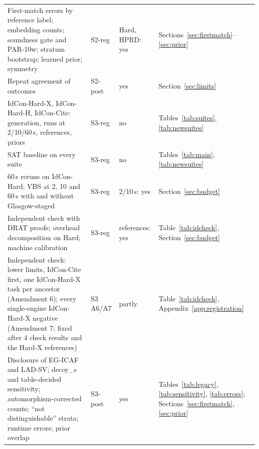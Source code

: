 \begin{table}[t]
\begin{tabular}{p{}llp{}}
First-match errors by reference label; embedding counts; soundness gate and PAR-10w; stratum bootstrap; learned prior; symmetry & S2-reg & Hard, HPRD: yes & Sections~\ref{sec:firstmatch}--\ref{sec:prior}\\
Repeat agreement of outcomes & S2-post & yes & Section~\ref{sec:limits}\\
IdCon-Hard-X, IdCon-Hard-H, IdCon-Cite: generation, runs at 2/10/60\,s, references, priors & S3-reg & no & Tables~\ref{tab:suites}, \ref{tab:newsuites}\\
SAT baseline on every suite & S3-reg & no & Tables~\ref{tab:main}, \ref{tab:newsuites}\\
60\,s reruns on IdCon-Hard; VBS at 2, 10 and 60\,s with and without Glasgow-staged & S3-reg & 2/10\,s: yes & Section~\ref{sec:budget}\\
Independent check with DRAT proofs; overhead decomposition on Hard; machine calibration & S3-reg & references: yes & Table~\ref{tab:idcheck}, Section~\ref{sec:budget}\\
Independent check: lower limits, IdCon-Cite first, one IdCon-Hard-X task per ancestor (Amendment 6); every single-engine IdCon-Hard-X negative (Amendment 7; fixed after 4 check results and the Hard-X references) & S3 A6/A7 & partly & Table~\ref{tab:idcheck}, Appendix~\ref{app:registration}\\
Disclosure of EG-ICAF and LAD-SV; \textsf{decoy\_s} and table-decided sensitivity; automorphism-corrected counts; ``not distinguishable'' strata; runtime errors; prior overlap & S3-post & yes & Tables~\ref{tab:legacy}, \ref{tab:sensitivity}, \ref{tab:errors}; Sections~\ref{sec:firstmatch}, \ref{sec:prior}\\
\bottomrule
\end{tabular}
\end{table}
